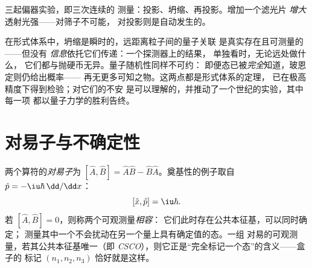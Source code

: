 \begin{omfigure}

{\small 三起偏器实验，即三次连续的
测量：投影、坍缩、再投影。增加一个滤光片
\emph{增大}透射光强——对筛子不可能，
对投影则是自动发生的。}
\end{omfigure}

\begin{remark}[坍缩不允许的事情]\label{rem:b3:quantum-formalism:nosignal}
在形式体系中，坍缩是瞬时的，远距离粒子间的量子关联
是真实存在且可测量的——但没有
\emph{信息}依托它们传递：一个探测器上的结果，
单独看时，无论远处做什么，
它们都与抛硬币无异。量子随机性同样不可约：
即便态已被\emph{完全}知道，玻恩定则仍给出概率——
再无更多可知之物。这两点都是形式体系的定理，
已在极高精度下得到检验；对它们的不安
是可以理解的，并推动了一个世纪的实验，其中每一项
都以量子力学的胜利告终。
\end{remark}

\section{对易子与不确定性}

\begin{definition}\label{def:b3:quantum-formalism:commutator}
两个算符的\emph{对易子}为 $[\hat A, \hat B] = \hat
A\hat B - \hat B\hat A$。奠基性的例子取自 $\hat p =
-\iu\hbar\,\dd/\dd x$：
\[
[\hat x, \hat p] = \iu\hbar .
\]
若 $[\hat A, \hat B] = 0$，则称两个可观测量\emph{相容}：
它们此时存在公共本征基，可以同时确定；
测量其中一个不会扰动在另一个量上具有确定值的态。一组
对易的可观测量，若其公共本征基唯一（即
\emph{CSCO}），则它正是“完全标记一个态”的含义——盒子的
标记 $(n_1, n_2, n_3)$ 恰好就是这样。
\end{definition}

